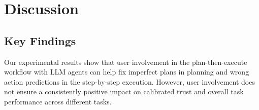 \section{Discussion}
\label{sec:discussion}


\subsection{Key Findings}
\label{sec:discussion-findings}
Our experimental results show that user involvement in the plan-then-execute workflow with LLM agents can %
help fix imperfect plans in planning and wrong action predictions in the step-by-step execution. 
However, user involvement does not ensure a consistently positive impact on calibrated trust and overall task performance across different tasks. 

